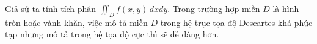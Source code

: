 \documentclass[preview]{standalone}
\begin{document}
\begin{center}
Giả sử ta tính tích phân $\iint_D f(x, y)\,dxdy$. Trong trường hợp miền $D$ là hình tròn hoặc vành khăn, việc mô tả miền $D$ trong hệ trục tọa độ Descartes khá phức tạp nhưng mô tả trong  hệ tọa độ cực thì sẽ dễ dàng hơn.
\end{center}
\end{document}
